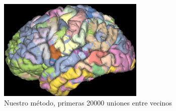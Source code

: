 \begin{figure}[h!]
    \centering
    \includegraphics[width=0.62\textwidth]{img/all_brain/vs_nuestro.png}
    \caption{Nuestro m\'etodo, primeras 20000 uniones entre vecinos}
    \label{fig:vs_nosotros}
\end{figure}


